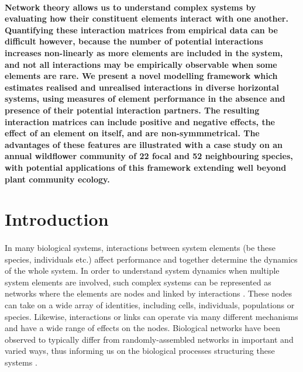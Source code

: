 \documentclass[a4,12pt]{article}
\begin{document}
    \paragraph{}
    \textbf{Network theory allows us to understand complex systems by evaluating how their constituent elements interact with one another. Quantifying these interaction matrices from empirical data can be difficult however, because the number of potential interactions increases non-linearly as more elements are included in the system, and not all interactions may be empirically observable when some elements are rare. We present a novel modelling framework which estimates realised and unrealised interactions in diverse horizontal systems, using measures of element performance in the absence and presence of their potential interaction partners. The resulting interaction matrices can include positive and negative effects, the effect of an element on itself, and are non-symmmetrical. The advantages of these features are illustrated with a case study on an annual wildflower community of 22 focal and 52 neighbouring species, with potential applications of this framework extending well beyond plant community ecology.}



\section{Introduction}

    
    \paragraph{}
    In many biological systems, interactions between system elements (be these species, individuals etc.) affect performance and together determine the dynamics of the whole system. In order to understand system dynamics when multiple system elements are involved, such complex systems can be represented as networks where the elements are nodes and linked by interactions \parencite{Pimm1978}. These nodes can take on a wide array of identities, including cells, individuals, populations or species. Likewise, interactions or links can operate via many different mechanisms and have a wide range of effects on the nodes. Biological networks have been observed to typically differ from randomly-assembled networks in important and varied ways, thus informing us on the biological processes structuring these systems \parencite{Dunne2002, Kinlock2019}.
\end{document}

